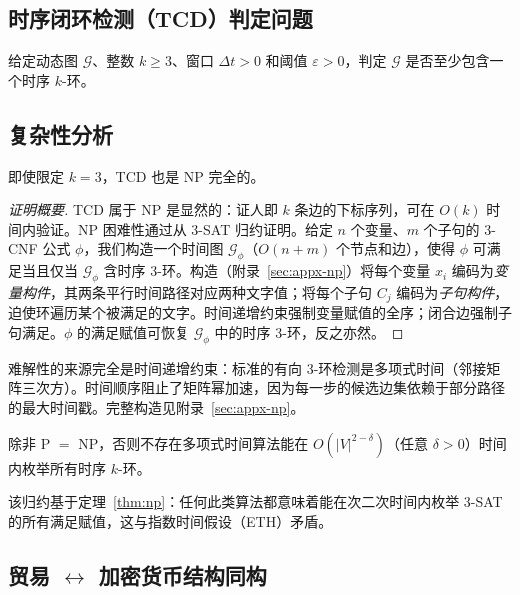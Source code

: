 \documentclass[journal,onecolumn]{IEEEtran}
\newcommand{\G}{\mathcal{G}}
\newcommand{\eps}{\varepsilon}
\begin{document}
\subsection{时序闭环检测（TCD）判定问题}
\label{sec:theory-tcd}

\begin{definition}[TCD]
给定动态图 $\G$、整数 $k \geq 3$、窗口 $\Delta t > 0$ 和阈值 $\eps > 0$，判定 $\G$ 是否至少包含一个时序 $k$-环。
\end{definition}

\subsection{复杂性分析}
\label{sec:theory-complexity}

\begin{theorem}
\label{thm:np}
即使限定 $k = 3$，TCD 也是 NP 完全的。
\end{theorem}
\begin{proof}[证明概要]
TCD 属于 NP 是显然的：证人即 $k$ 条边的下标序列，可在 $O(k)$ 时间内验证。NP 困难性通过从 3-SAT 归约证明。给定 $n$ 个变量、$m$ 个子句的 3-CNF 公式 $\phi$，我们构造一个时间图 $\G_\phi$（$O(n+m)$ 个节点和边），使得 $\phi$ 可满足当且仅当 $\G_\phi$ 含时序 3-环。构造（附录~\ref{sec:appx-np}）将每个变量 $x_i$ 编码为\emph{变量构件}，其两条平行时间路径对应两种文字值；将每个子句 $C_j$ 编码为\emph{子句构件}，迫使环遍历某个被满足的文字。时间递增约束强制变量赋值的全序；闭合边强制子句满足。$\phi$ 的满足赋值可恢复 $\G_\phi$ 中的时序 3-环，反之亦然。
\end{proof}

难解性的来源完全是时间递增约束：标准的有向 3-环检测是多项式时间（邻接矩阵三次方）。时间顺序阻止了矩阵幂加速，因为每一步的候选边集依赖于部分路径的最大时间戳。完整构造见附录~\ref{sec:appx-np}。

\begin{theorem}[近似难解性]
\label{thm:approx}
除非 P $=$ NP，否则不存在多项式时间算法能在 $O(|V|^{2-\delta})$（任意 $\delta > 0$）时间内枚举所有时序 $k$-环。
\end{theorem}
该归约基于定理~\ref{thm:np}：任何此类算法都意味着能在次二次时间内枚举 3-SAT 的所有满足赋值，这与指数时间假设（ETH）矛盾。

\subsection{贸易 $\leftrightarrow$ 加密货币结构同构}
\label{sec:theory-iso}
\end{document}
